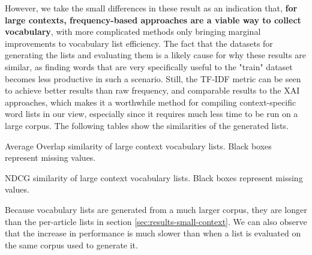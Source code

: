 However, we take the small differences in these result as an indication that, \textbf{for large contexts, frequency-based approaches are a viable way to collect vocabulary}, with more complicated methods only bringing marginal improvements to vocabulary list efficiency.
The fact that the datasets for generating the lists and evaluating them is a likely cause for why these results are similar, as finding words that are very specifically useful to the "train" dataset becomes less productive in such a scenario.
Still, the TF-IDF metric can be seen to achieve better results than raw frequency, and comparable results to the XAI approaches, which makes it a worthwhile method for compiling context-specific word lists in our view, especially since it requires much less time to be run on a large corpus.
The following tables show the similarities of the generated lists.


\begin{table}[H]
	\centering
	\resizebox{\textwidth}{!}{%
		
	}
	\caption{Average Overlap similarity of large context vocabulary lists. Black boxes represent missing values.}
	\label{tbl:similarity-results-big-average-overlap}
\end{table}

\begin{table}[H]
	\centering
	\resizebox{\textwidth}{!}{%
		
	}
	\caption{NDCG similarity of large context vocabulary lists. Black boxes represent missing values.}
	\label{tbl:similarity-results-big-ndcg}
\end{table}





% 	


% 		


Because vocabulary lists are generated from a much larger corpus, they are longer than the per-article lists in section \ref{sec:results-small-context}.
We can also observe that the increase in performance is much slower than when a list is evaluated on the same corpus used to generate it.


